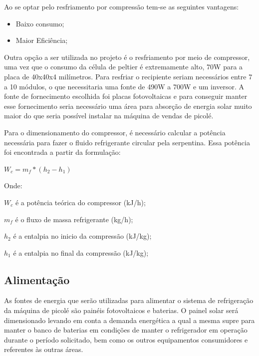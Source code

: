 Ao se optar pelo resfriamento por compressão tem-se as seguintes vantagens:

\begin{itemize}
\item Baixo consumo;

\item Maior Eficiência;
\end{itemize}


Outra opção a ser utilizada no projeto é o resfriamento por meio de compressor, uma vez que o consumo da célula de peltier é extremamente alto, 70W para a placa de 40x40x4 milímetros. Para resfriar o recipiente seriam necessários entre 7 a 10 módulos, o que necessitaria uma fonte de 490W a 700W e um inversor. A fonte de fornecimento escolhida foi placas fotovoltaicas e para conseguir manter esse fornecimento seria necessário uma área para absorção de energia solar muito maior do que seria possível instalar na máquina de vendas de picolé. 


Para o dimensionamento do compressor, é necessário calcular a potência necessária para fazer o fluido refrigerante circular pela serpentina. Essa potência foi encontrada a
partir da formulação:

\begin{math} W_{c} = m_{f} * (h_{2} - h_{1})  \end{math}

Onde:

$W_{c}$ é a potência teórica do compressor (kJ/h);

$m_{f}$ é o fluxo de massa refrigerante (kg/h);

$h_{2}$ é a entalpia no inicio da compressão (kJ/kg);

$h_{1}$ é a entalpia no final da compressão (kJ/kg);


\subsection{Alimentação}
	As fontes de energia que serão utilizadas para alimentar o sistema de refrigeração da máquina de picolé são painéis fotovoltaicos e baterias. O painel solar será dimensionado levando em conta a demanda energética a qual a mesma supre para manter o banco de baterias em condições de manter o refrigerador em operação durante o período solicitado, bem como os outros equipamentos consumidores e referentes às outras áreas.
    
